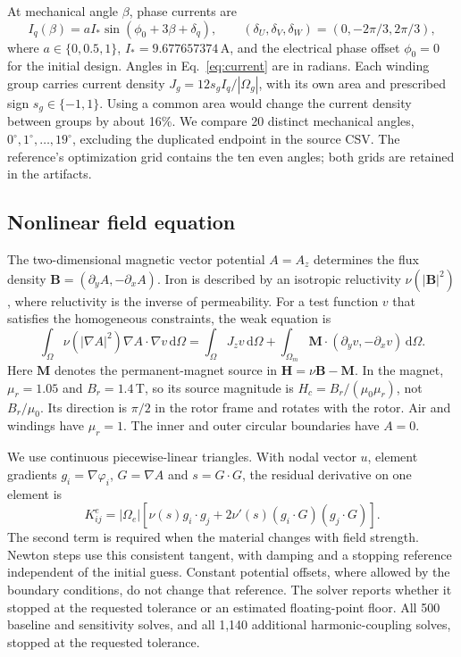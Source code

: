 \documentclass{anvil-paper}
\newcommand{\dd}{\,\mathrm{d}}
\begin{document}
At mechanical angle $\beta$, phase currents are
\begin{equation}
 I_q(\beta)=a I_*\sin(\phi_0+3\beta+\delta_q),\qquad
 (\delta_U,\delta_V,\delta_W)=(0,-2\pi/3,2\pi/3),
 \label{eq:current}
\end{equation}
where $a\in\{0,0.5,1\}$, $I_*=9.677657374$\,A, and the electrical phase
offset $\phi_0=0$ for the initial design. Angles in
Eq.~\eqref{eq:current} are in radians. Each winding group carries current
density $J_g=12s_g I_q/|\Omega_g|$, with its own area and prescribed sign
$s_g\in\{-1,1\}$. Using a common area would change the current density
between groups by about 16\%. We compare 20 distinct mechanical angles,
$0^\circ,1^\circ,\ldots,19^\circ$, excluding the duplicated endpoint in
the source CSV. The reference's optimization grid contains the ten even
angles; both grids are retained in the artifacts.

\subsection{Nonlinear field equation}
The two-dimensional magnetic vector potential $A=A_z$ determines the
flux density $\mathbf B=(\partial_y A,-\partial_x A)$. Iron is described
by an isotropic reluctivity $\nu(|\mathbf B|^2)$, where reluctivity is
the inverse of permeability. For a test function $v$ that satisfies the
homogeneous constraints, the weak equation is
\begin{equation}
 \int_\Omega \nu(|\nabla A|^2)\nabla A\cdot\nabla v\dd\Omega
 =\int_\Omega J_z v\dd\Omega
  +\int_{\Omega_m}\mathbf M\cdot(\partial_y v,-\partial_x v)\dd\Omega.
 \label{eq:weak}
\end{equation}
Here $\mathbf M$ denotes the permanent-magnet source in
$\mathbf H=\nu\mathbf B-\mathbf M$. In the magnet,
$\mu_r=1.05$ and $B_r=1.4$\,T, so its source magnitude is
$H_c=B_r/(\mu_0\mu_r)$, not $B_r/\mu_0$. Its direction is $\pi/2$
in the rotor frame and rotates with the rotor. Air and windings have
$\mu_r=1$. The inner and outer circular boundaries have $A=0$.

We use continuous piecewise-linear triangles. With nodal vector $u$,
element gradients $g_i=\nabla\varphi_i$, $G=\nabla A$ and $s=G\cdot G$,
the residual derivative on one element is
\begin{equation}
 K^e_{ij}=|\Omega_e|\left[\nu(s)g_i\cdot g_j
       +2\nu'(s)(g_i\cdot G)(g_j\cdot G)\right].
 \label{eq:tangent}
\end{equation}
The second term is required when the material changes with field strength.
Newton steps use this consistent tangent, with damping and a stopping
reference independent of the initial guess. Constant potential offsets,
where allowed by the boundary conditions, do not change that reference.
The solver reports whether it stopped at the requested tolerance or an
estimated floating-point floor. All 500 baseline and sensitivity solves, and all 1,140
additional harmonic-coupling solves, stopped at the requested tolerance.
\end{document}
